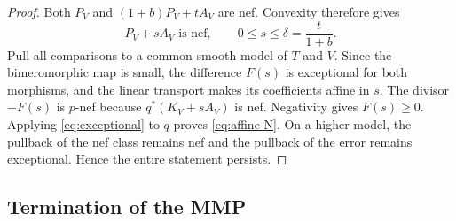 \documentclass[11pt,a4paper]{article}
\theoremstyle{definition}\newtheorem{definition}[theorem]{Definition}
\theoremstyle{remark}\newtheorem*{remark}{Remark}
\begin{document}
\begin{proof}
Both $P_V$ and $(1+b)P_V+tA_V$ are nef. Convexity therefore gives
\[
 P_V+sA_V\text{ is nef},\qquad 0\le s\le\delta=\frac{t}{1+b}.
\]
Pull all comparisons to a common smooth model of $T$ and $V$. Since the
bimeromorphic map is small, the difference $F(s)$ is exceptional for both
morphisms, and the linear transport makes its coefficients affine in $s$.
The divisor $-F(s)$ is $p$-nef because $q^*(K_V+sA_V)$ is nef. Negativity gives
$F(s)\ge0$. Applying \eqref{eq:exceptional} to $q$ proves
\eqref{eq:affine-N}. On a higher model, the pullback of the nef class remains
nef and the pullback of the error remains exceptional. Hence the entire
statement persists.
\end{proof}

\subsection{Termination of the MMP}
\end{document}
